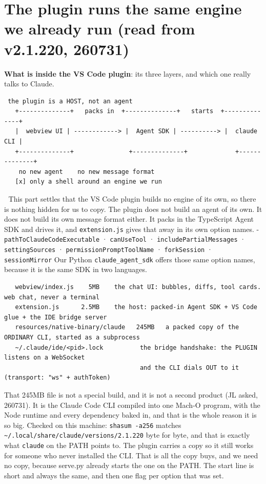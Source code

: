 
\section{The plugin runs the same engine we already run (read from v2.1.220, 260731)}
\textbf{What is inside the VS Code plugin}: its three layers, and which one really talks to Claude.

\begin{verbatim}
 the plugin is a HOST, not an agent
   +--------------+   packs in  +--------------+   starts  +--------------+
   |  webview UI | ------------> |  Agent SDK | ----------> |  claude CLI |
   +--------------+               +--------------+             +--------------+
    no new agent    no new message format
   [x] only a shell around an engine we run
\end{verbatim}
📌 This part settles that the VS Code plugin builds no engine of its own, so there is nothing hidden for us to copy. The plugin does not build an agent of its own. It does not build its own message format either. It packs in the TypeScript Agent SDK and drives it, and \texttt{extension.js} gives that away in its own option names. - \texttt{pathToClaudeCodeExecutable} · \texttt{canUseTool} · \texttt{includePartialMessages} · \texttt{settingSources} · \texttt{permissionPromptToolName} · \texttt{forkSession} · \texttt{sessionMirror} Our Python \texttt{claude\_agent\_sdk} offers those same option names, because it is the same SDK in two languages.

\begin{verbatim}
   webview/index.js    5MB    the chat UI: bubbles, diffs, tool cards. web chat, never a terminal
   extension.js      2.5MB    the host: packed-in Agent SDK + VS Code glue + the IDE bridge server
   resources/native-binary/claude   245MB   a packed copy of the ORDINARY CLI, started as a subprocess
   ~/.claude/ide/<pid>.lock          the bridge handshake: the PLUGIN listens on a WebSocket
                                     and the CLI dials OUT to it (transport: "ws" + authToken)
\end{verbatim}
That 245MB file is not a special build, and it is not a second product (JL asked, 260731). It is the Claude Code CLI compiled into one Mach-O program, with the Node runtime and every dependency baked in, and that is the whole reason it is so big. Checked on this machine: \texttt{shasum -a256} matches \texttt{\textasciitilde{}/.local/share/claude/versions/2.1.220} byte for byte, and that is exactly what \texttt{claude} on the PATH points to. The plugin carries a copy so it still works for someone who never installed the CLI. That is all the copy buys, and we need no copy, because serve.py already starts the one on the PATH. The start line is short and always the same, and then one flag per option that was set.

